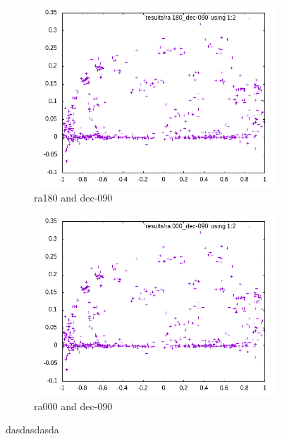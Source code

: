 \begin{figure}[!htb]
	\begin{subfigure}[b]{0.5\textwidth}
		\includegraphics[width=\linewidth]{images/ch4/ra180_dec-090.png}
		\caption{ra180 and dec-090}
	\end{subfigure}
	\hfill
	\begin{subfigure}[b]{0.5\textwidth}
		\includegraphics[width=\linewidth]{images/ch4/ra000_dec-090.png}
		\caption{ra000 and dec-090}
	\end{subfigure}
	\caption{dasdasdasda}
	\label{fig:poles}
\end{figure}





